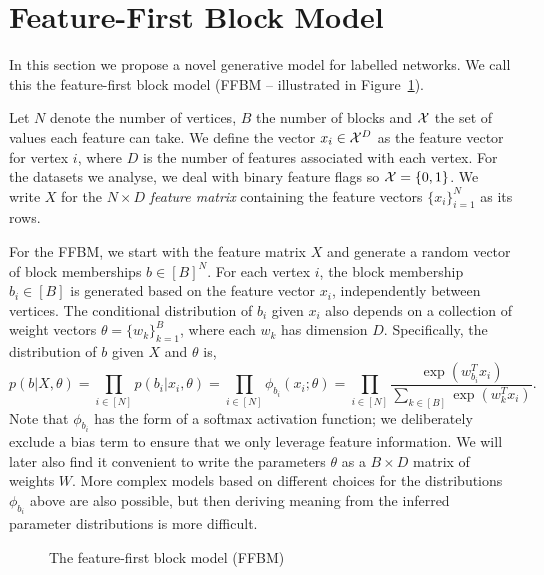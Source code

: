 \section{Feature-First Block Model}

In this section we propose a novel generative model for labelled networks. We call this the feature-first block model (FFBM -- illustrated in Figure~\ref{fig:ffbm}).

Let $N$ denote the number of vertices, $B$ the number of blocks
and ${\cal X}$ the set of values each feature can take.
We define the vector $x_i \in \mathcal{X}^D$ as the feature vector for vertex $i$, 
where $D$ is the number of features associated with each vertex.
For the datasets we analyse, we deal with binary feature flags so $\mathcal{X} = \{0, 1\}$. We write $X$ for the $N\times D$ {\em feature matrix} containing
the feature vectors $\{x_i\}_{i=1}^{N}$ 
as its rows.

For the FFBM, we start with the feature matrix $X$ and generate a random
vector of block memberships $b \in [B]^N$. For each vertex $i$, the
block membership $b_i\in[B]$ is generated based on the feature
vector $x_i$, independently between vertices. The conditional
distribution of $b_i$ given $x_i$ also depends on a collection
of weight vectors $\theta=\{w_k\}_{k=1}^B$, where each
$w_k$ has dimension $D$. Specifically, 
the distribution of $b$ given $X$ and $\theta$ is,
%
\begin{equation}
	p(b| X, \theta) = \prod_{i \in [N]} p(b_i | x_i, \theta) = \prod_{i \in [N]} \phi_{b_i} (x_i; \theta)
	= \prod_{i \in [N]} \frac{\exp\left(w_{b_i}^T x_i\right)}{\sum_{k \in [B]} \exp \left( w_k^T x_i\right)}.
\end{equation}
%
Note that $\phi_{b_i}$ has the form of a softmax activation function;
we deliberately exclude a bias term to ensure that we only leverage feature information.
We will later also find it convenient
to write the parameters $\theta$ as a $B \times D$ matrix of weights $W$.
More complex models based on different choices for the distributions
$\phi_{b_i}$ above are also possible, but then deriving meaning from 
the inferred parameter distributions is more difficult. 
%
\begin{figure}
	\centering
	\caption{The feature-first block model (FFBM)}
	\label{fig:ffbm}
\end{figure}

